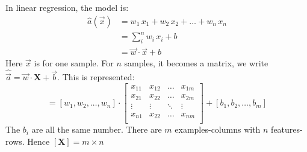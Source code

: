 In linear regression, the model is:
\begin{align*}
  \hat{a}(\vec{x}) &= w_1\,x_1 + w_2\,x_2 +\ldots+ w_n\,x_n\\
   &= \sum_i^n w_i\, x_i + b \\
   &= \vec{w}\cdot\vec{x} + b
\end{align*}
Here $\vec{x}$ is for one sample. For $n$ samples, it becomes a matrix, we write $\hat{\vec{a}} = \vec{w}\cdot\mathbf{X} + \vec{b}$. This is represented:
\begin{equation*}
  [a_1, a_2, \ldots, a_n] = 
  [w_1, w_2, \ldots, w_n] \cdot
  \begin{bmatrix}
    x_{11} & x_{12} & \ldots & x_{1m}\\
    x_{21} & x_{22} & \ldots & x_{2m}\\
    \vdots & \vdots & \ddots & \vdots\\
    x_{n1} & x_{22} & \ldots & x_{nm}\\
  \end{bmatrix}
  + [b_1, b_2, \ldots, b_m]
\end{equation*}
The $b_i$ are all the same number. There are $m$ examples-columns with $n$ features-rows. Hence $[\mathbf{X}] = m\times{}n$

